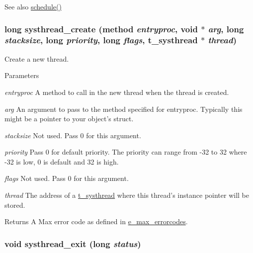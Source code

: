 \begin{DoxySeeAlso}{See also}
\hyperlink{group__threading_ga1eb8ec7623f0806dd079d7be708c19a8}{schedule()} 
\end{DoxySeeAlso}
\hypertarget{group__threading_ga7217fa33811a5ed35b970f504b4e4a79}{
\subsubsection[{systhread\_\-create}]{\setlength{\rightskip}{0pt plus 5cm}long systhread\_\-create ({\bf method} {\em entryproc}, \/  void $\ast$ {\em arg}, \/  long {\em stacksize}, \/  long {\em priority}, \/  long {\em flags}, \/  {\bf t\_\-systhread} $\ast$ {\em thread})}}
\label{group__threading_ga7217fa33811a5ed35b970f504b4e4a79}


Create a new thread. 
\begin{DoxyParams}{Parameters}
\item[{\em entryproc}]A method to call in the new thread when the thread is created. \item[{\em arg}]An argument to pass to the method specified for entryproc. Typically this might be a pointer to your object's struct. \item[{\em stacksize}]Not used. Pass 0 for this argument. \item[{\em priority}]Pass 0 for default priority. The priority can range from -\/32 to 32 where -\/32 is low, 0 is default and 32 is high. \item[{\em flags}]Not used. Pass 0 for this argument. \item[{\em thread}]The address of a \hyperlink{group__threading_gaaf0068b8e9ac28430873484727029315}{t\_\-systhread} where this thread's instance pointer will be stored. \end{DoxyParams}
\begin{DoxyReturn}{Returns}
A Max error code as defined in \hyperlink{group__misc_ga0764dd6c02b76cca7d053ae50555d69d}{e\_\-max\_\-errorcodes}. 
\end{DoxyReturn}
\hypertarget{group__threading_gad448ff5be27ef8233162a0e24751786f}{
\subsubsection[{systhread\_\-exit}]{\setlength{\rightskip}{0pt plus 5cm}void systhread\_\-exit (long {\em status})}}
\label{group__threading_gad448ff5be27ef8233162a0e24751786f}


